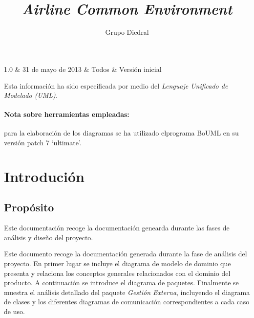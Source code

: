 \documentclass[11pt, a4paper, twoside, titlepage]{article}
\title{\doctitle\\\textsl{Airline Common Environment}}
\author{Grupo Diedral}
\newcommand*{\doctitle}{Análisis y diseño}
\newcommand*{\docversion}{1.0}
\begin{document}
	\begin{tablacambios}
		1.0 & 31 de mayo de 2013 & Todos & Versión inicial
	\end{tablacambios}


	\portadaace{\doctitle}{\docversion}

	\tableofcontents
	\newpage

	\iniciarnumeraciondiedral

	\begin{prologo}
		

		Esta información ha sido especificada por medio del \itshape{Lenguaje Unificado de Modelado} (UML).

	\paragraph*{Nota sobre herramientas empleadas:} para la elaboración de los diagramas se ha utilizado el\break programa {\normalfont BoUML} en su versión { patch 7 `ultimate'}.
	\end{prologo}

	\section{Introdución}
		\subsection{Propósito}
			Este documentación recoge la documentación genearda durante las fases de análisis y diseño del proyecto.

			Este documento recoge la documentación generada durante la fase de análisis del proyecto. En primer lugar se incluye el diagrama de modelo de dominio que presenta y relaciona los conceptos generales relacionados con el dominio del producto. A continuación se introduce el diagrama de paquetes. Finalmente se muestra el análisis detallado del paquete {\itshape Gestión Externa}, incluyendo el diagrama de clases y los diferentes diagramas de comunicación correspondientes a cada caso de uso.\\

\end{document}
